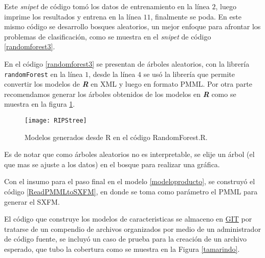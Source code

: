   
 
 Este \textit{snipet} de código  tomó los datos de entrenamiento en la línea $2$, luego imprime los resultados y entrena en la línea $11$, finalmente se poda.  En este mismo código se desarrollo  bosques aleatorios, un mejor enfoque para afrontar los problemas de clasificación\cite{Hastie2009,Caruana2006}, como se muestra en el \textit{snipet} de código \ref{randomforest3}.
 
 
 
 En el código \ref{randomforest3} se presentan de árboles aleatorios, con la librería \texttt{randomForest} en la línea $1$,  desde la línea $4$ se usó la librería que permite convertir los modelos de \textbf{\textit{R}} en XML y luego en formato PMML.
 Por otra parte recomendamos generar los árboles obtenidos de los modelos en \textbf{\textit{R}} como se muestra en la figura \ref{RIPStree}.

\begin{figure}[h]
	\centering
	\texttt{[image: RIPStree]}
	\caption{Modelos generados desde R en el código RandomForest.R.}
	\label{RIPStree}
\end{figure}
 
 Es de notar que como árboles aleatorios no es interpretable, se elije un árbol (el que mas se ajuste a los datos) en el bosque para realizar una gráfica.
 
Con el insumo para el paso final en el modelo \ref{modeloproducto}, se construyó el código \ref{ReadPMMLtoSXFM},  en donde se toma como parámetro el PMML para generar el SXFM.

 
 
  El código que construye los modelos de caracteristicas  se almaceno en \href{https://github.com/josepplloo/tamarindo}{GIT} por tratarse de un compendio de archivos organizados por medio de un administrador de código fuente, se incluyó un caso de prueba para la creación de un archivo esperado, que tubo la  cobertura como se muestra en la Figura \ref{tamarindo}.
  
